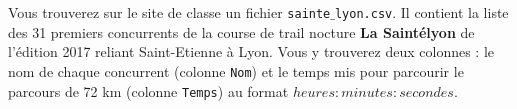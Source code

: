 Vous trouverez sur le site de classe un fichier \texttt{sainte$\_$lyon.csv}.
Il contient la liste des 31 premiers concurrents de la course de trail nocture \textbf{La Saintélyon} de l'édition 2017 reliant Saint-Etienne à Lyon. 
Vous y trouverez deux colonnes : le nom de chaque concurrent (colonne \texttt{Nom}) et le temps mis pour parcourir le parcours de 72 km (colonne \texttt{Temps}) au format $heures:minutes:secondes$. 

